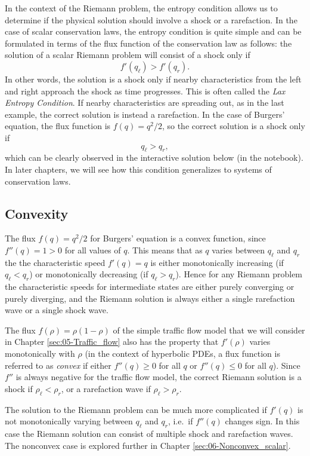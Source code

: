 \documentclass{SIAMbook2016}
\begin{document}
In the context of the Riemann problem, the entropy condition allows us
to determine if the physical solution should involve a shock or a
rarefaction. In the case of scalar conservation laws, the entropy
condition is quite simple and can be formulated in terms of the flux
function of the conservation law as follows: the solution of a scalar
Riemann problem will consist of a shock only if \[
f'(q_\ell) > f'(q_r).
\] In other words, the solution is a shock only if nearby
characteristics from the left and right approach the shock as time
progresses. This is often called the \emph{Lax Entropy Condition}. If
nearby characteristics are spreading out, as in the last example, the
correct solution is instead a rarefaction. In the case of Burgers'
equation, the flux function is \(f(q)=q^2/2\), so the correct solution
is a shock only if \[
q_\ell > q_r,
\] which can be clearly observed in the interactive solution below (in
the notebook). In later chapters, we will see how this condition
generalizes to systems of conservation laws.

\hypertarget{convexity}{%
\subsection{Convexity}\label{convexity}}

The flux \(f(q) = q^2/2\) for Burgers' equation is a convex function,
since \(f''(q) = 1 > 0\) for all values of \(q\). This means that as
\(q\) varies between \(q_\ell\) and \(q_r\) the the characteristic speed
\(f'(q) = q\) is either monotonically increasing (if \(q_\ell < q_r\))
or monotonically decreasing (if \(q_\ell > q_r\)). Hence for any Riemann
problem the characteristic speeds for intermediate states are either
purely converging or purely diverging, and the Riemann solution is
always either a single rarefaction wave or a single shock wave.

The flux \(f(\rho) = \rho(1-\rho)\) of the simple traffic flow model
that we will consider in Chapter \ref{sec:05-Traffic_flow} also has the
property that \(f'(\rho)\) varies monotonically with \(\rho\) (in the
context of hyperbolic PDEs, a flux function is referred to as
\emph{convex} if either \(f''(q)\ge0\) for all \(q\) or \(f''(q)\le 0\)
for all \(q\)). Since \(f''\) is always negative for the traffic flow
model, the correct Riemann solution is a shock if
\(\rho_\ell < \rho_r\), or a rarefaction wave if \(\rho_\ell > \rho_r\).

The solution to the Riemann problem can be much more complicated if
\(f'(q)\) is not monotonically varying between \(q_\ell\) and \(q_r\),
i.e.~if \(f''(q)\) changes sign. In this case the Riemann solution can
consist of multiple shock and rarefaction waves. The nonconvex case is
explored further in Chapter \ref{sec:06-Nonconvex_scalar}.
\end{document}
